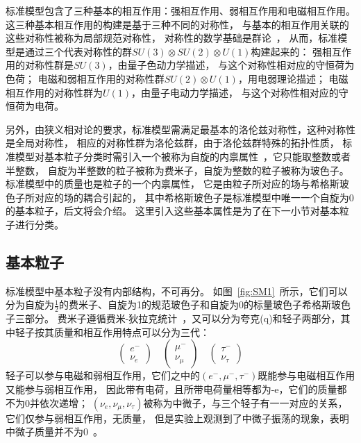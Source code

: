 标准模型包含了三种基本的相互作用：强相互作用、弱相互作用和电磁相互作用。
这三种基本相互作用的构建是基于三种不同的对称性，
与基本的相互作用关联的这些对称性被称为局部规范对称性，
对称性的数学基础是群论~\cite{GROUP}，
从而，标准模型是通过三个代表对称性的群$SU(3)	\otimes SU(2)	\otimes U(1)$构建起来的：
强相互作用的对称性群是$SU(3)$，由量子色动力学描述，
与这个对称性相对应的守恒荷为色荷；
电磁和弱相互作用的对称性群$SU(2)	\otimes U(1)$，用电弱理论描述；
电磁相互作用的对称性群为$U(1)$，由量子电动力学描述，
与这个对称性相对应的守恒荷为电荷。

另外，由狭义相对论的要求，标准模型需满足最基本的洛伦兹对称性，这种对称性是全局对称性，
相应的对称性群为洛伦兹群，由于洛伦兹群特殊的拓扑性质，
标准模型对基本粒子分类时需引入一个被称为自旋的内禀属性~\cite{QFT1}，它只能取整数或者半整数，
自旋为半整数的粒子被称为费米子，自旋为整数的粒子被称为玻色子。
标准模型中的质量也是粒子的一个内禀属性，
它是由粒子所对应的场与希格斯玻色子所对应的场的耦合引起的，
其中希格斯玻色子是标准模型中唯一一个自旋为0的基本粒子，后文将会介绍。
这里引入这些基本属性是为了在下一小节对基本粒子进行分类。

\subsection{基本粒子}
\label{sec:EP}

标准模型中基本粒子没有内部结构，不可再分。
如图~\ref{fig:SM1}~所示，它们可以分为自旋为$\frac{1}{2}$的费米子、自旋为1的规范玻色子和自旋为0的标量玻色子希格斯玻色子三部分。
费米子遵循费米-狄拉克统计~\cite{FERMIS1,FERMIS2}，又可以分为夸克(q)和轻子两部分，其中轻子按其质量和相互作用特点可以分为三代：
\begin{equation} 
\label{eq:EP1}
\left( \begin{aligned}
e^-\\ \nu_e
\end{aligned}
\right)
\quad
\left( \begin{aligned}
\mu^-\\ \nu_{\mu}
\end{aligned}
\right)
\quad
\left( \begin{aligned}
\tau^-\\ \nu_{\tau}
\end{aligned}
\right)
\end{equation}
轻子可以参与电磁和弱相互作用，它们之中的$(e^-,\mu^-,\tau^-)$既能参与电磁相互作用又能参与弱相互作用，
因此带有电荷，且所带电荷量相等都为-e，它们的质量都不为0并依次递增；
$(\nu_e,\nu_{\mu},\nu_{\tau})$被称为中微子，与三个轻子有一一对应的关系，它们仅参与弱相互作用，无质量，
但是实验上观测到了中微子振荡的现象，表明中微子质量并不为0~\cite{NEUTRINO1,NEUTRINO2}。

